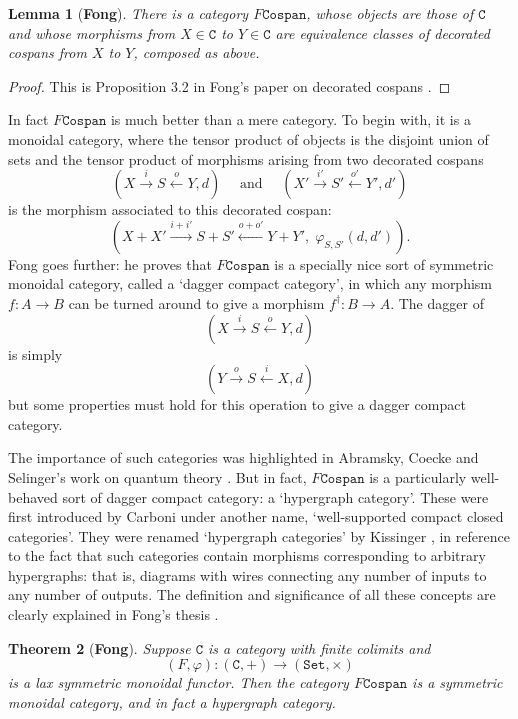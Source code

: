 \documentclass{compositionalityarticle}
\newcommand{\Set}{\mathtt{Set}}
\newcommand{\Cospan}{\mathtt{Cospan}}
\newcommand{\CC}{\mathtt{C}}
\newcommand{\maps}{\colon}
\theoremstyle{compositionality}
\newtheorem{thm}{Theorem}
\newtheorem{lem}[thm]{Lemma}
\theoremstyle{remark}
\begin{document}
\begin{lem}[\textbf{Fong}] \label{lemma:fcospans}
There is a category $F\Cospan$, whose objects are those of $\CC$ and whose
morphisms from $X \in \CC$ to $Y \in \CC$ are equivalence classes of decorated cospans from $X$ to $Y$, composed as above.  
\end{lem}

\begin{proof}
This is Proposition 3.2 in Fong's paper on decorated cospans \cite{Fong2015}.
\end{proof}

In fact $F\Cospan$ is much better than a mere category.  To begin with, it is
a monoidal category, where the tensor product of objects is the disjoint union of sets and the tensor product of morphisms arising from two decorated cospans 
\[
    (X \stackrel{i}{\longrightarrow} S \stackrel{o}{\longleftarrow} Y, d) 
    \quad \textrm{ and } \quad
    (X' \stackrel{i'}{\longrightarrow} S' \stackrel{o'}{\longleftarrow} Y', d')
  \]
is the morphism associated to this decorated cospan:
\[  ( X + X' \stackrel{i+i'}{\longrightarrow} S + S'  \stackrel{o + o'}{\longleftarrow} Y + Y', \;
\varphi_{S,S'}(d,d') ) .\]
Fong goes further: he proves that $F\Cospan$ is a specially nice sort of 
symmetric monoidal category, called a `dagger compact category',
in which any morphism $f \maps A \to B$ can be turned around to give a 
morphism $f^\dagger \maps B \to A$.  The dagger of 
\[
    (X \stackrel{i}{\longrightarrow} S \stackrel{o}{\longleftarrow} Y, d) 
\]
is simply 
\[
    (Y \stackrel{o}{\longrightarrow} S \stackrel{i}{\longleftarrow} X, d) 
\]
but some properties must hold for this operation to give a dagger compact category.

The importance of such categories was highlighted in Abramsky, Coecke and 
Selinger's work on quantum theory \cite{AC,Selinger}.   But in fact, 
$F\Cospan$ is a particularly well-behaved sort of dagger compact category: a 
`hypergraph category'.   These were first introduced by Carboni \cite{Carboni} under another name, `well-supported compact closed categories'.  They were renamed `hypergraph categories' by Kissinger \cite{Kissinger}, in reference to the fact that such categories contain morphisms corresponding to arbitrary hypergraphs: that is, diagrams with wires connecting any number of inputs to any number of outputs.   The definition and significance of all these concepts are clearly explained in Fong's thesis \cite{FongThesis}.  

\begin{thm}[\textbf{Fong}] \label{thm:fcospans}
  Suppose $\CC$ is a category with finite colimits and 
  \[
    (F,\varphi)\maps (\CC,+) \longrightarrow (\Set, \times)
  \]
is a lax symmetric monoidal functor.  Then the category $F\Cospan$ is a symmetric
monoidal category, and in fact a hypergraph
category.
\end{thm}
\end{document}
